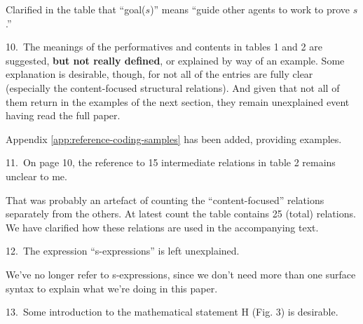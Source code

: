 Clarified in the table that ``goal($s$)'' means ``guide other agents to work to prove $s$.''


\begin{mdframed}[backgroundcolor=orange!10]
10.~The meanings of the performatives and  contents in tables 1 and 2 are suggested, \textbf{but not really defined}, or explained by way of an example. Some explanation is desirable, though, for not all of the entries are fully clear (especially the content-focused structural relations). And given that not all of them return in the examples of the next section, they remain unexplained event having read the full paper.
\end{mdframed}

Appendix \ref{app:reference-coding-samples} has been added, providing examples.

\begin{mdframed}[backgroundcolor=orange!10]
11.~On page 10, the reference to 15 intermediate relations in table 2 remains unclear to me.
\end{mdframed}

That was probably an artefact of counting the ``content-focused''
relations separately from the others.  At latest count the table
contains 25 (total) relations.  We have clarified how these relations
are used in the accompanying text.

\begin{mdframed}[backgroundcolor=orange!10]
12.~The expression ``s-expressions'' is left unexplained.
\end{mdframed}

We've no longer refer to s-expressions, since we don't need more than
one surface syntax to explain what we're doing in this paper. 

\begin{mdframed}[backgroundcolor=orange!10]
13.~Some introduction to the mathematical statement H (Fig. 3) is desirable.
\end{mdframed}

